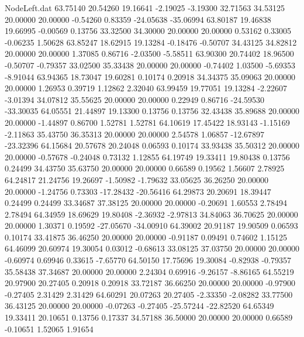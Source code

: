 \begin{filecontents}{NodeLeft.dat}
  63.75140   20.54260   19.16641    -2.19025   -3.19300   32.71563   34.53125   20.00000   20.00000   -0.54260    0.83359  -24.05638  -35.06994
  63.80187   19.46838   19.66995    -0.00569    0.13756   33.32500   34.30000   20.00000   20.00000    0.53162    0.33005   -0.06235    1.50628
  63.85247   18.62915   19.13284    -0.18476   -0.50707   34.43125   34.82812   20.00000   20.00000    1.37085    0.86716   -2.03500   -5.58511
  63.90300   20.74402   18.96500    -0.50707   -0.79357   33.02500   35.33438   20.00000   20.00000   -0.74402    1.03500   -5.69353   -8.91044
  63.94365   18.73047   19.60281     0.10174    0.20918   34.34375   35.09063   20.00000   20.00000    1.26953    0.39719    1.12862    2.32040
  63.99459   19.77051   19.13284    -2.22607   -3.01394   34.07812   35.55625   20.00000   20.00000    0.22949    0.86716  -24.59530  -33.30035
  64.05551   21.44897   19.13300     0.13756    0.13756   32.43438   35.89688   20.00000   20.00000   -1.44897    0.86700    1.52781    1.52781
  64.10619   17.45422   18.93143    -1.15169   -2.11863   35.43750   36.35313   20.00000   20.00000    2.54578    1.06857  -12.67897  -23.32396
  64.15684   20.57678   20.24048     0.06593    0.10174   33.93438   35.50312   20.00000   20.00000   -0.57678   -0.24048    0.73132    1.12855
  64.19749   19.33411   19.80438     0.13756    0.24499   34.43750   35.63750   20.00000   20.00000    0.66589    0.19562    1.56607    2.78925
  64.24817   21.24756   19.26697    -1.50982   -1.79632   33.05625   36.26250   20.00000   20.00000   -1.24756    0.73303  -17.28432  -20.56416
  64.29873   20.20691   18.39447     0.24499    0.24499   33.34687   37.38125   20.00000   20.00000   -0.20691    1.60553    2.78494    2.78494
  64.34959   18.69629   19.80408    -2.36932   -2.97813   34.84063   36.70625   20.00000   20.00000    1.30371    0.19592  -27.05670  -34.00910
  64.39002   20.91187   19.90509     0.06593    0.10174   33.41875   36.46250   20.00000   20.00000   -0.91187    0.09491    0.74602    1.15125
  64.46099   20.60974   19.30054     0.03012   -0.68613   33.08125   37.03750   20.00000   20.00000   -0.60974    0.69946    0.33615   -7.65770
  64.50150   17.75696   19.30084    -0.82938   -0.79357   35.58438   37.34687   20.00000   20.00000    2.24304    0.69916   -9.26157   -8.86165
  64.55219   20.97900   20.27405     0.20918    0.20918   33.72187   36.66250   20.00000   20.00000   -0.97900   -0.27405    2.31429    2.31429
  64.60291   20.07263   20.27405    -2.33350   -2.08282   33.77500   36.43125   20.00000   20.00000   -0.07263   -0.27405  -25.57244  -22.82520
  64.65349   19.33411   20.10651     0.13756    0.17337   34.57188   36.50000   20.00000   20.00000    0.66589   -0.10651    1.52065    1.91654

\end{filecontents}
